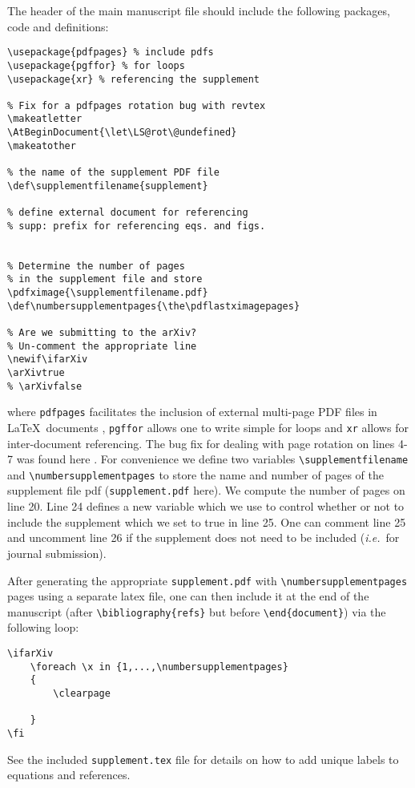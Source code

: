 \documentclass[10pt,twocolumn,prl,aps,floatfix,superscriptaddress,longbibliography]{revtex4-1}
\def\supplementfilename{supplement}
\def\numbersupplementpages{\the\pdflastximagepages}
\newif\ifarXiv
\begin{document}
The header of the main manuscript file should include the following packages, code and definitions:
%
\begin{lstlisting}
\usepackage{pdfpages} % include pdfs
\usepackage{pgffor} % for loops
\usepackage{xr} % referencing the supplement

% Fix for a pdfpages rotation bug with revtex
\makeatletter
\AtBeginDocument{\let\LS@rot\@undefined}
\makeatother

% the name of the supplement PDF file
\def\supplementfilename{supplement}

% define external document for referencing
% supp: prefix for referencing eqs. and figs.


% Determine the number of pages 
% in the supplement file and store
\pdfximage{\supplementfilename.pdf}
\def\numbersupplementpages{\the\pdflastximagepages}

% Are we submitting to the arXiv? 
% Un-comment the appropriate line
\newif\ifarXiv
\arXivtrue 
% \arXivfalse
\end{lstlisting}
%
where \texttt{pdfpages} facilitates the inclusion of external multi-page PDF files in \LaTeX~documents \cite{pdfpages}, \texttt{pgffor} allows one to write simple for loops and \texttt{xr} allows for inter-document referencing.  The bug fix for dealing with page rotation on lines 4-7 was found here \cite{rotate}. For convenience we define two variables \verb!\supplementfilename! and \verb!\numbersupplementpages! to store the name and number of pages of the supplement file pdf (\texttt{supplement.pdf} here).  We compute the number of pages on line 20. Line 24 defines a new variable which we use to control whether or not to include the supplement which we set to true in line 25.  One can comment line 25 and uncomment line 26 if the supplement does not need to be included (\emph{i.e.}~for journal submission).

After generating the appropriate \texttt{supplement.pdf} with \verb!\numbersupplementpages! pages using a separate latex file, one can then include it at the end of the manuscript (after \texttt{\textbackslash bibliography\{refs\}} but before \texttt{\textbackslash end\{document\}}) via the following loop: \\ 
%
\begin{lstlisting}
\ifarXiv
    \foreach \x in {1,...,\numbersupplementpages}
    {
        \clearpage
        
    }
\fi
\end{lstlisting}
%
See the included \texttt{supplement.tex} file for details on how to add unique
labels to equations and references.
\end{document}
